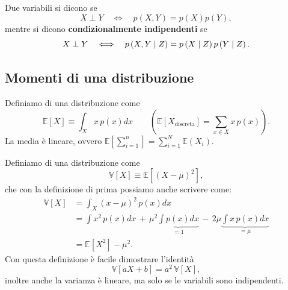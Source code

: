 \documentclass[10pt]{article}
\newcommand{\pare}[1]{
	\ensuremath{\left(#1\right)}
}
\newcommand{\spare}[1]{
	\ensuremath{\left[#1\right]}
}
\begin{document}
Due variabili si dicono  se
\begin{equation}
X\perp Y \quad\Longleftrightarrow\quad p\pare{X, Y} = p\pare{X} p\pare{Y},
\end{equation}
mentre si dicono \textbf{condizionalmente indipendenti} se
\begin{equation}
X\perp Y \quad\Longleftrightarrow\quad p\pare{X, Y\cond Z} = p\pare{X\cond Z} p\pare{Y\cond Z}. 
\end{equation}

\subsection{Momenti di una distribuzione}

\begin{definition}[Media] Definiamo  di una distribuzione come
\begin{equation}
\mathbb{E}\spare{X} \equiv \int_X x\, p\pare{x}dx \qquad\pare{ \mathbb{E}\spare{X_{\text{discreta}}} = \sum_{x\in X} x\, p\pare{x} }.
\end{equation}
La media è lineare, ovvero $\mathbb{E}\spare{\sum_{i=1}^n} = \sum_{i=1}^N \mathbb{E}\pare{X_i}$.
\end{definition}

\begin{definition}[Varianza] Definiamo  di una distribuzione come
\begin{equation}
\mathbb{V}\spare{X} \equiv \mathbb{E}\spare{\pare{X - \mu}^2},
\end{equation}
che con la definizione di prima possiamo anche scrivere come:
\begin{equation}
\begin{split}
\mathbb{V}\spare{X} &= \int_X \pare{x - \mu}^2\, p\pare{x}dx \\
&= \int x^2\, p\pare{x}dx \, +\, \mu^2\underbrace{\int p\pare{x}dx}_{=1} \, -\, 2\mu\underbrace{\int x\, p\pare{x}dx}_{=\mu} \\
&= \mathbb{E}\spare{X^2} - \mu^2.
\end{split}
\end{equation}
Con questa definizione è facile dimostrare l'identità
\begin{equation}
\mathbb{V}\spare{aX + b} = a^2\,\mathbb{V}\spare{X},
\end{equation}
inoltre anche la varianza è lineare, ma solo se le variabili sono indipendenti.
\end{definition}
\end{document}
